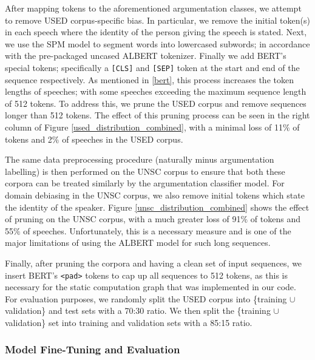 After mapping tokens to the aforementioned argumentation classes, we attempt to remove USED corpus-specific bias. In particular, we remove the initial token(s) in each speech where the identity of the person giving the speech is stated. Next, we use the SPM model to segment words into lowercased subwords; in accordance with the pre-packaged uncased ALBERT tokenizer. Finally we add BERT's special tokens; specifically a \texttt{[CLS]} and \texttt{[SEP]} token at the start and end of the sequence respectively. As mentioned in \ref{bert}, this process increases the token lengths of speeches; with some speeches exceeding the maximum sequence length of 512 tokens. To address this, we prune the USED corpus and remove sequences longer than 512 tokens. The effect of this pruning process can be seen in the right column of Figure \ref{used_distribution_combined}, with a minimal loss of 11$\%$ of tokens and 2$\%$ of speeches in the USED corpus.

The same data preprocessing procedure (naturally minus argumentation labelling) is then performed on the UNSC corpus to ensure that both these corpora can be treated similarly by the argumentation classifier model. For domain debiasing in the UNSC corpus, we also remove initial tokens which state the identity of the speaker. Figure \ref{unsc_distribution_combined} shows the effect of pruning on the UNSC corpus, with a much greater loss of 91$\%$ of tokens and 55$\%$ of speeches. Unfortunately, this is a necessary measure and is one of the major limitations of using the ALBERT model for such long sequences.

Finally, after pruning the corpora and having a clean set of input sequences, we insert BERT's \texttt{<pad>} tokens to cap up all sequences to 512 tokens, as this is necessary for the static computation graph that was implemented in our code. For evaluation purposes, we randomly split the USED corpus into \{training $\cup$ validation\} and test sets with a 70:30 ratio. We then split the \{training $\cup$ validation\} set into training and validation sets with a 85:15 ratio.

\subsubsection{Model Fine-Tuning and Evaluation}
\label{fine_tune}

